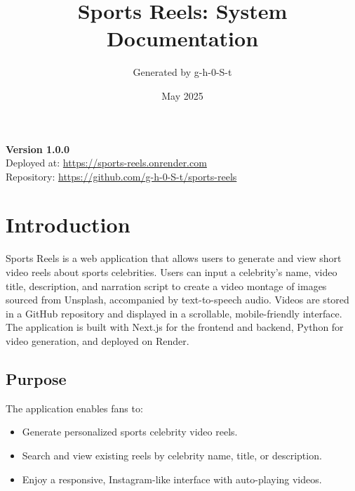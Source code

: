 \documentclass[a4paper,12pt]{article}
\title{Sports Reels: System Documentation}
\author{Generated by g-h-0-S-t}
\date{May 2025}
\begin{document}
\maketitle
\begin{center}
    \vspace{1cm}
    \textbf{Version 1.0.0} \\
    \vspace{0.5cm}
    Deployed at: \url{https://sports-reels.onrender.com} \\
    Repository: \url{https://github.com/g-h-0-S-t/sports-reels}
\end{center}
\thispagestyle{empty}
\newpage

\tableofcontents
\newpage

\section{Introduction}
Sports Reels is a web application that allows users to generate and view short video reels about sports celebrities. Users can input a celebrity's name, video title, description, and narration script to create a video montage of images sourced from Unsplash, accompanied by text-to-speech audio. Videos are stored in a GitHub repository and displayed in a scrollable, mobile-friendly interface. The application is built with Next.js for the frontend and backend, Python for video generation, and deployed on Render.

\subsection{Purpose}
The application enables fans to:
\begin{itemize}
    \item Generate personalized sports celebrity video reels.
    \item Search and view existing reels by celebrity name, title, or description.
    \item Enjoy a responsive, Instagram-like interface with auto-playing videos.
\end{itemize}
\end{document}

